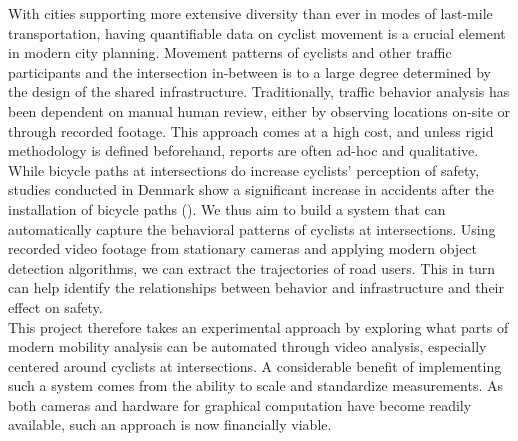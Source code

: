 With cities supporting more extensive diversity than ever in modes of last-mile transportation,
having quantifiable data on cyclist movement is a crucial element in modern city planning. 
Movement patterns of cyclists and other traffic participants and the intersection in-between 
is to a large degree determined by the design of the shared infrastructure. 
Traditionally, traffic behavior analysis has been dependent on manual human review, either by observing locations on-site or through recorded footage. 
This approach comes at a high cost, and unless rigid methodology is defined beforehand, reports are often ad-hoc and qualitative. 
\ \\

While bicycle paths at intersections do increase cyclists' perception of safety, 
studies conducted in Denmark show a significant increase in accidents after the installation of bicycle paths (\cite{intersection_safety}).
We thus aim to build a system that can automatically capture the behavioral patterns of cyclists at intersections.
Using recorded video footage from stationary cameras and applying modern object detection algorithms, 
we can extract the trajectories of road users. 
This in turn can help identify the relationships between behavior and infrastructure and their effect on safety. 
\ \\

This project therefore takes an experimental approach by exploring what parts of modern mobility analysis can be automated
through video analysis, especially centered around cyclists at intersections.
A considerable benefit of implementing such a system comes from the ability to scale and standardize measurements.
As both cameras and hardware for graphical computation have become readily available, such an approach is now financially viable.
